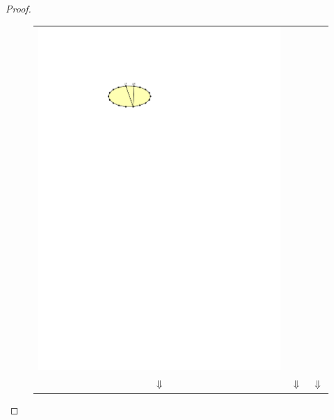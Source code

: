 \documentclass{article}
\theoremstyle{definition}
\begin{document}
\begin{proof}
\begin{figure}
\begin{tabular}{ccc}
      \includegraphics[page=5]{figs/minimal} \\
      $\Downarrow$ & $\Downarrow$ & $\Downarrow$ \\

\end{tabular}
\end{figure}
\end{proof}
\end{document}
